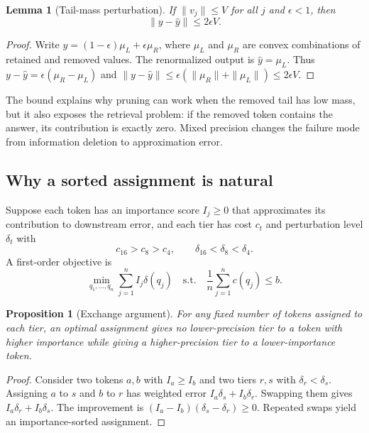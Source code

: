 \documentclass[11pt]{article}
\newcommand{\budget}{b}
\theoremstyle{plain}
\newtheorem{lemma}{Lemma}
\newtheorem{proposition}{Proposition}
\theoremstyle{definition}
\begin{document}
\begin{lemma}[Tail-mass perturbation]
If $\|v_j\|\le V$ for all $j$ and $\epsilon<1$, then
\begin{equation}
  \|y-\hat y\|\le 2\epsilon V .
\end{equation}
\end{lemma}
\begin{proof}
Write $y=(1-\epsilon)\mu_L+\epsilon\mu_R$, where $\mu_L$ and $\mu_R$ are convex combinations of retained and removed values.  The renormalized output is $\hat y=\mu_L$.  Thus $y-\hat y=\epsilon(\mu_R-\mu_L)$ and $\|y-\hat y\|\le \epsilon(\|\mu_R\|+\|\mu_L\|)\le 2\epsilon V$.
\end{proof}

The bound explains why pruning can work when the removed tail has low mass, but it also exposes the retrieval problem: if the removed token contains the answer, its contribution is exactly zero.  Mixed precision changes the failure mode from information deletion to approximation error.

\subsection{Why a sorted assignment is natural}
Suppose each token has an importance score $I_j\ge 0$ that approximates its contribution to downstream error, and each tier has cost $c_t$ and perturbation level $\delta_t$ with
\begin{equation}
 c_{16}>c_8>c_4,
 \qquad
 \delta_{16}<\delta_8<\delta_4 .
\end{equation}
A first-order objective is
\begin{equation}
  \min_{q_1,\ldots,q_n}\sum_{j=1}^{n} I_j\delta(q_j)
  \quad\text{s.t.}\quad
  \frac{1}{n}\sum_{j=1}^{n}c(q_j)\le \budget .
  \label{eq:assignment}
\end{equation}

\begin{proposition}[Exchange argument]
For any fixed number of tokens assigned to each tier, an optimal assignment gives no lower-precision tier to a token with higher importance while giving a higher-precision tier to a lower-importance token.
\end{proposition}
\begin{proof}
Consider two tokens $a,b$ with $I_a\ge I_b$ and two tiers $r,s$ with $\delta_r<\delta_s$.  Assigning $a$ to $s$ and $b$ to $r$ has weighted error $I_a\delta_s+I_b\delta_r$.  Swapping them gives $I_a\delta_r+I_b\delta_s$.  The improvement is $(I_a-I_b)(\delta_s-\delta_r)\ge 0$.  Repeated swaps yield an importance-sorted assignment.
\end{proof}
\end{document}
